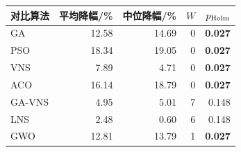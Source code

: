 \begin{tabular*}{0.84\linewidth}{@{\extracolsep{\fill}}lrrrr@{}}
\toprule
对比算法 & 平均降幅/\% & 中位降幅/\% & $W$ & $p_{\rm Holm}$ \\
\midrule
GA & 12.58 & 14.69 & 0 & \textbf{0.027} \\
PSO & 18.34 & 19.05 & 0 & \textbf{0.027} \\
VNS & 7.89 & 4.71 & 0 & \textbf{0.027} \\
ACO & 16.14 & 18.79 & 0 & \textbf{0.027} \\
GA-VNS & 4.95 & 5.01 & 7 & 0.148 \\
LNS & 2.48 & 0.60 & 6 & 0.148 \\
GWO & 12.81 & 13.79 & 1 & \textbf{0.027} \\
\bottomrule
\end{tabular*}
